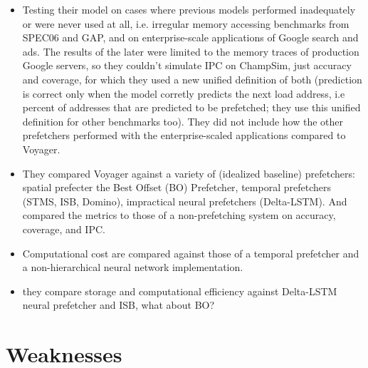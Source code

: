 \documentclass [12pt]{article}
\begin{document}
        \begin{itemize}
            \item Testing their model on cases where previous models performed inadequately or were never used at all, i.e. irregular memory accessing benchmarks from SPEC06 and GAP, and on enterprise-scale applications of Google search and ads. The results of the later were limited to the memory traces of production Google servers, so they couldn't simulate IPC on ChampSim, just accuracy and coverage, for which they used a new unified definition of both (prediction is correct only when the model corretly predicts the next load address, i.e percent of addresses that are predicted to be prefetched; they use this unified definition for other benchmarks too). They did not include how the other prefetchers performed with the enterprise-scaled applications compared to Voyager.
            \item They compared Voyager against a variety of (idealized baseline) prefetchers: spatial prefecter the Best Offset (BO) Prefetcher, temporal prefetchers (STMS, ISB, Domino), impractical neural prefetchers (Delta-LSTM). And compared the metrics to those of a non-prefetching system on accuracy, coverage, and IPC.
            \item Computational cost are compared against those of a temporal prefetcher and a non-hierarchical neural network implementation.
            \item they compare storage and computational efficiency against Delta-LSTM neural prefetcher and ISB, what about BO?
        \end{itemize}

    \section{Weaknesses} %
    \label{sec:weaknesses}
\end{document}
